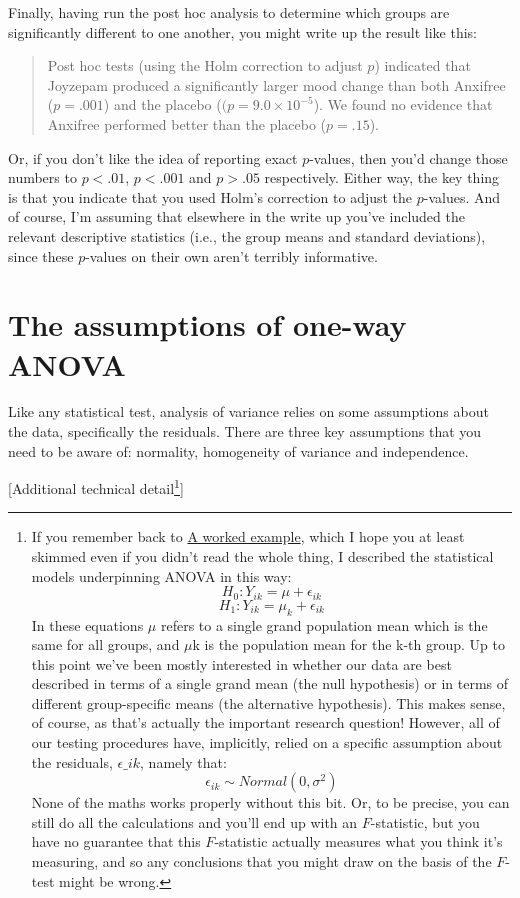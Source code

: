 \documentclass[
  a4paper,
]{book}
\begin{document}
Finally, having run the post hoc analysis to determine which groups are
significantly different to one another, you might write up the result
like this:

\begin{quote}
Post hoc tests (using the Holm correction to adjust \(p\)) indicated
that Joyzepam produced a significantly larger mood change than both
Anxifree (\(p = .001\)) and the placebo (\((p = 9.0 \times{10^{-5}}\)).
We found no evidence that Anxifree performed better than the placebo
(\(p = .15\)).
\end{quote}

Or, if you don't like the idea of reporting exact \(p\)-values, then
you'd change those numbers to \(p < .01\), \(p < .001\) and \(p > .05\)
respectively. Either way, the key thing is that you indicate that you
used Holm's correction to adjust the \(p\)-values. And of course, I'm
assuming that elsewhere in the write up you've included the relevant
descriptive statistics (i.e., the group means and standard deviations),
since these \(p\)-values on their own aren't terribly informative.

\hypertarget{the-assumptions-of-one-way-anova}{%
\section{The assumptions of one-way
ANOVA}\label{the-assumptions-of-one-way-anova}}

Like any statistical test, analysis of variance relies on some
assumptions about the data, specifically the residuals. There are three
key assumptions that you need to be aware of: normality, homogeneity of
variance and independence.

{[}Additional technical detail\footnote{If you remember back to
  \protect\hyperlink{a-worked-example}{A worked example}, which I hope
  you at least skimmed even if you didn't read the whole thing, I
  described the statistical models underpinning ANOVA in this way:
  \[H_0:Y_{ik}=\mu + \epsilon_{ik}\]
  \[H_1:Y_{ik}=\mu_k + \epsilon_{ik}\] In these equations \(\mu\) refers
  to a single grand population mean which is the same for all groups,
  and \(\mu\)k is the population mean for the k-th group. Up to this
  point we've been mostly interested in whether our data are best
  described in terms of a single grand mean (the null hypothesis) or in
  terms of different group-specific means (the alternative hypothesis).
  This makes sense, of course, as that's actually the important research
  question! However, all of our testing procedures have, implicitly,
  relied on a specific assumption about the residuals,
  \(\epsilon\_{ik}\), namely that:
  \[\epsilon_{ik} \sim Normal(0,\sigma^2)\] None of the maths works
  properly without this bit. Or, to be precise, you can still do all the
  calculations and you'll end up with an \(F\)-statistic, but you have
  no guarantee that this \(F\)-statistic actually measures what you
  think it's measuring, and so any conclusions that you might draw on
  the basis of the \(F\)-test might be wrong.}{]}
\end{document}
